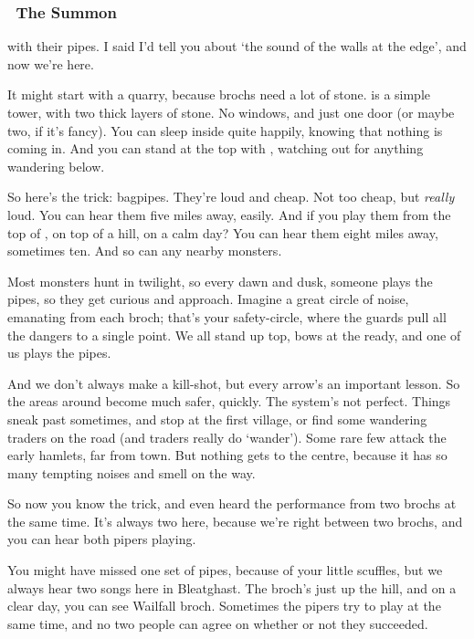 \subsubsection*{~The  Summon }
with their pipes.
I said I'd tell you about `the sound of the walls at the \gls{edge}', and now we're here.

It might start with a quarry, because \glspl{broch} need a lot of stone.
 is a simple tower, with two thick layers of stone.
No windows, and just one door (or maybe two, if it's fancy).
You can sleep inside  quite happily, knowing that nothing is coming in.
And you can stand at the top with , watching out for anything wandering below.

So here's the trick: bagpipes.
They're loud and cheap.
Not too cheap, but \emph{really} loud.
You can hear them five miles away, easily.
And if you play them from the top of , on top of a hill, on a calm day?
You can hear them eight miles away, sometimes ten.
And so can any nearby \glspl{monster}.

Most \glspl{monster} hunt in twilight, so every dawn and dusk, someone plays the pipes, so they get curious and approach.
Imagine a great circle of noise, emanating from each \gls{broch}; that's your safety-circle, where the \glspl{guard} pull all the dangers to a single point.
We all stand up top, \glspl{bow} at the ready, and one of us plays the pipes.

And we don't always make a kill-shot, but every arrow's an important lesson.
So the areas around  become much safer, quickly.
The system's not perfect.
Things sneak past sometimes, and stop at the first \gls{village}, or find some wandering traders on the road (and traders really do `wander').
Some rare few attack the early hamlets, far from town.
But nothing gets to the centre, because it has so many tempting noises and smell on the way.

So now you know the trick, and even heard the performance from two \glspl{broch} at the same time.
It's always two here, because we're right between two \glspl{broch}, and you can hear both pipers playing.

You might have missed one set of pipes, because of your little scuffles, but we always hear two songs here in Bleatghast.
The \gls{broch}'s just up the hill, and on a clear day, you can see Wailfall \gls{broch}.
Sometimes the pipers try to play at the same time, and no two people can agree on whether or not they succeeded.

